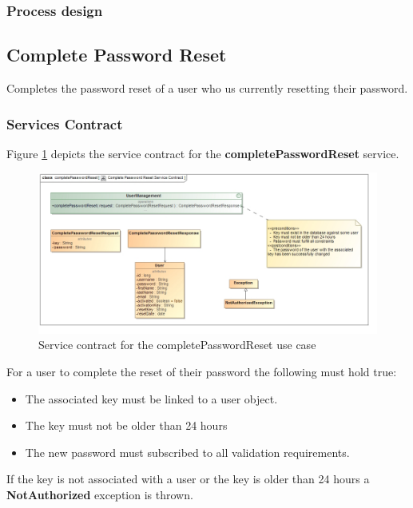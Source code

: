 \subsubsection{Process design}

\subsection{Complete Password Reset}
Completes the password reset of a user who us currently resetting their password.

\subsubsection{Services Contract}
Figure \ref{fig:completePasswordResetServicesContract} depicts the service contract for the \textbf{completePasswordReset} service.

\begin{figure}[H]
  \begin{center}
  \includegraphics[scale=0.55]{../Diagrams and Charts/Users/Complete Password Reset Service Contract.jpg}
  \caption{Service contract for the completePasswordReset use case}
  \label{fig:completePasswordResetServicesContract}
  \end{center}  
\end{figure}

For a user to complete the reset of their password the following must hold true:
\begin{itemize}
	\item The associated key must be linked to a user object.
	\item The key must not be older than 24 hours
	\item The new password must subscribed to all validation requirements.
\end{itemize}

If the key is not associated with a user or the key is older than 24 hours a \textbf{NotAuthorized} exception is thrown.

